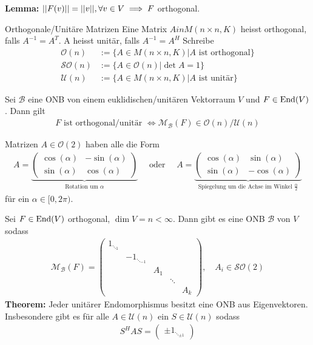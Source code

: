 \textbf{Lemma:} \quad $\vert\vert F(v)\vert\vert = \vert\vert v\vert\vert, \forall v \in V \implies F$ orthogonal.

\begin{definition}{Orthogonale/Unitäre Matrizen}
    Eine Matrix $A in M(n\times n,K)$ heisst orthogonal,  falls $A^{-1} = A^T$. 
    A heisst unitär, falls $A^{-1} = A^H$
    Schreibe
    \begin{align*}
        \mathcal{O}(n) &:= \{A \in M(n\times n,K) \big\vert A \text{ ist orthogonal}\}\\
        \mathcal{SO}(n) &:= \{A \in \mathcal{O}(n)    \big\vert \det A = 1\}\\
        \mathcal{U}(n) &:= \{A \in M(n\times n,K) \big\vert A \text{ ist unitär}\}
    \end{align*}
\end{definition}

Sei $\mathcal{B}$ eine ONB von einem euklidischen/unitären Vektorraum $V$ und $F \in \operatorname{End}(V)$. Dann gilt
\begin{align*}
    F \text{ ist orthogonal/unitär }  \Leftrightarrow \mathcal{M}_{\mathcal{B}}(F) \in \mathcal{O}(n)/ \mathcal{U}(n)
\end{align*}

Matrizen $A \in \mathcal{O}(2)$ haben alle die Form
\begin{align*}
    A = \underbrace{\begin{pmatrix}
        \cos(\alpha) & -\sin(\alpha)\\
        \sin(\alpha) & \cos(\alpha)
    \end{pmatrix}}_{\text{Rotation um $\alpha$}}
    \quad \text{ oder } \quad A = \underbrace{\begin{pmatrix}
        \cos(\alpha) & \sin(\alpha)\\
        \sin(\alpha) & -\cos(\alpha)
    \end{pmatrix}}_{\text{Spiegelung um die Achse im Winkel $\frac{\alpha}{2}$}}
\end{align*}
für ein $\alpha \in [0,2\pi)$. 


Sei $F \in \operatorname{End}(V)$ orthogonal, $\dim V = n < \infty$. Dann gibt es eine ONB $\mathcal{B}$ von $V$ sodass
\begin{align*}
    \mathcal{M}_{\mathcal{B}}(F) = \begin{pmatrix}
        1_{\ddots_{1}}\\
        & {-1}_{\ddots_{-1}}\\
        & & A_1\\
        & & & \ddots\\
        & & & & A_k
    \end{pmatrix}, \quad A_i \in \mathcal{SO}(2)
\end{align*}
\textbf{Theorem:} \quad Jeder unitärer Endomorphismus besitzt eine ONB aus Eigenvektoren. Insbesondere gibt es für alle $A \in \mathcal{U}(n)$ ein $S \in \mathcal{U}(n)$ sodass 
\begin{align*}
    S^H A S = \begin{pmatrix}
        \pm 1_{\ddots_{\pm 1}}
    \end{pmatrix}
\end{align*}